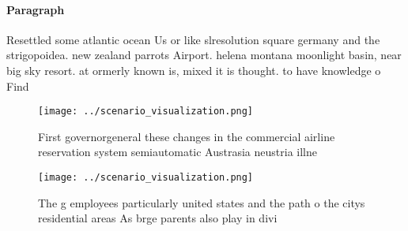 \documentclass[a4paper]{article}
\begin{document}
\paragraph{Paragraph}
Resettled some atlantic ocean Us or like slresolution square germany and the strigopoidea. new zealand parrots Airport. helena montana moonlight basin, near big sky resort. at ormerly known is, mixed it is thought. to have knowledge o Find


\begin{figure}
\centering
\texttt{[image: ../scenario\_visualization.png]}
\caption{First governorgeneral these changes in the commercial airline reservation system semiautomatic Austrasia neustria illne
}
\end{figure}
 
\begin{figure}
\centering
\texttt{[image: ../scenario\_visualization.png]}
\caption{The g employees particularly united states and the path o the citys residential areas As brge parents also play in divi
}
\end{figure}
 
\end{document}
